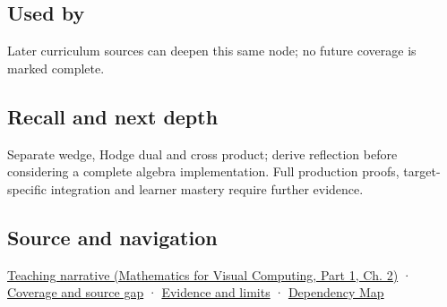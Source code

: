 \subsection{Used by}\label{appendix-e1960925d1b8-used-by}

\hypertarget{appendix-e1960925d1b8-used-by}{}

Later curriculum sources can deepen this same node; no future coverage is marked complete.

\subsection{Recall and next depth}\label{appendix-e1960925d1b8-recall-and-next-depth}

\hypertarget{appendix-e1960925d1b8-recall-and-next-depth}{}

Separate wedge, Hodge dual and cross product; derive reflection before considering a complete algebra implementation. Full production proofs, target-specific integration and learner mastery require further evidence.

\subsection{Source and navigation}\label{appendix-e1960925d1b8-source-and-navigation}

\hypertarget{appendix-e1960925d1b8-source-and-navigation}{}

\href{../02-Mathematics-for-Visual-Computing-P01/main.pdf\#01-foundations-i-ch018-oriented-areas-deserve-their-own-representation}{Teaching narrative (Mathematics for Visual Computing, Part 1, Ch. 2)} · \hyperref[appendix-fd090d982a15-phase-6---parts-501-600]{Coverage and source gap} · \hyperref[appendix-a103e7846d21-phase-6---source-analysis-and-verification]{Evidence and limits} · \hyperref[appendix-4ad47bdd269a]{Dependency Map}
